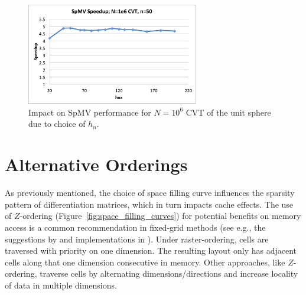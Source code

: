 \documentclass{report}
\begin{document}
\begin{figure}
\centering
\includegraphics[width=7.5cm]{../figures/stencils/cvt1m_spmv_speedup.png} 
\caption{Impact on SpMV performance for $N=10^6$ CVT of the unit sphere due to choice of $h_n$.}
\label{fig:spmv_vs_hn}
\end{figure}


%
%







\section{Alternative Orderings}


As previously mentioned, the choice of space filling curve influences the sparsity pattern of differentiation matrices, which in turn impacts cache effects. The use of $Z$-ordering (Figure~\ref{fig:space_filling_curves}) for potential benefits on memory access is a common recommendation in fixed-grid methods (see e.g., the suggestions by \cite{Johnson2011,Green2010,Krog2010} and implementations in \cite{Goswami2010, MellorCrummey2001}). Under raster-ordering, cells are traversed with priority on one dimension. The resulting layout only has adjacent cells along that one dimension consecutive in memory. Other approaches, like $Z$-ordering, traverse cells by alternating dimensions/directions and increase locality of data in multiple dimensions. 
\end{document}
